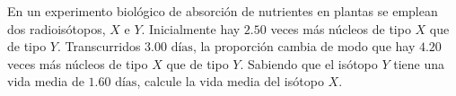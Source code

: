 \item En un experimento biológico de absorción de nutrientes en plantas se emplean dos radioisótopos, $X$ e $Y$. Inicialmente hay $2.50$ veces más núcleos de tipo $X$ que de tipo $Y$. Transcurridos $3.00\text{ días}$, la proporción cambia de modo que hay $4.20$ veces más núcleos de tipo $X$ que de tipo $Y$. Sabiendo que el isótopo $Y$ tiene una vida media de $1.60\text{ días}$, calcule la vida media del isótopo $X$.